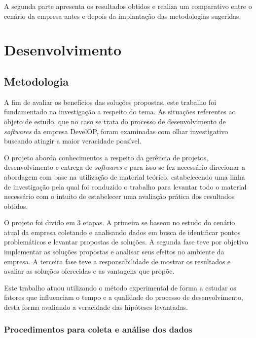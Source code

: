 \documentclass[
	12pt,				%
	openright,			%
	oneside,			%
	a4paper,			%
	english,			%
	french,				%
	spanish,			%
	brazil,				%
	]{abntex2}
\begin{document}
A segunda parte apresenta os resultados obtidos e realiza um comparativo entre o cenário da empresa antes e depois da implantação das metodologias sugeridas.

\part{Desenvolvimento}

\chapter{Metodologia}

A fim de avaliar os benefícios das soluções propostas, este trabalho foi fundamentado na investigação a respeito do tema. As situações referentes ao objeto de estudo, que no caso se trata do processo de desenvolvimento de \textit{softwares} da empresa DevelOP, foram examinadas com olhar investigativo buscando atingir a maior veracidade possível.

O projeto aborda conhecimentos a respeito da gerência de projetos, desenvolvimento e entrega de \textit{softwares} e para isso se fez necessário direcionar a abordagem com base na utilização de material teórico, estabelecendo uma linha de investigação pela qual foi conduzido o trabalho para levantar todo o material necessário com o intuito de estabelecer uma avaliação prática dos resultados obtidos.

O projeto foi divido em 3 etapas. A primeira se baseou no estudo do cenário atual da empresa coletando e analisando dados em busca de identificar pontos problemáticos e levantar propostas de soluções. A segunda fase teve por objetivo implementar as soluções propostas e analisar seus efeitos no ambiente da empresa. A terceira fase teve a responsabilidade de mostrar os resultados e avaliar as soluções oferecidas e as vantagens que propõe.

Este trabalho atuou utilizando o método experimental de forma a estudar os fatores que influenciam o tempo e a qualidade do processo de desenvolvimento, desta forma avaliando a veracidade das hipóteses levantadas.

\section{Procedimentos para coleta e análise dos dados}
\end{document}
